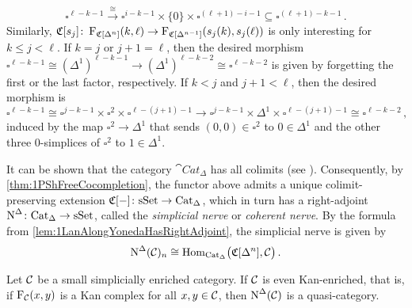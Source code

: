 \begin{con}
	\begin{equation*}
		\square^{\ell-k-1}\overset{\cong}{\longrightarrow}\square^{i-k-1}\times\{0\}\times\square^{(\ell+1)-i-1}\subseteq \square^{(\ell+1)-k-1}\,.
	\end{equation*}
	Similarly, $\mathfrak{C}[s_j]\colon \operatorname{F}_{\mathfrak{C}[\Delta^n]}(k,\ell)\rightarrow\operatorname{F}_{\mathfrak{C}[\Delta^{n-1}]}(s_j(k),s_j(\ell))$ is only interesting for $k\leqslant j<\ell$. If $k=j$ or $j+1=\ell$, then the desired morphism $\square^{\ell-k-1}\cong (\Delta^1)^{\ell-k-1}\rightarrow (\Delta^1)^{\ell-k-2}\cong \square^{\ell-k-2}$ is given by forgetting the first or the last factor, respectively. If $k<j$ and $j+1<\ell$, then the desired morphism is
	\begin{equation*}
		\square^{\ell-k-1}\cong \square^{j-k-1}\times\square^2\times\square^{\ell-(j+1)-1}\longrightarrow\square^{j-k-1}\times\Delta^1\times\square^{\ell-(j+1)-1}\cong \square^{\ell-k-2}\,,
	\end{equation*}
	induced by the map $\square^2\rightarrow\Delta^1$ that sends $(0,0)\in\square^2$ to $0\in\Delta^1$ and the other three $0$-simplices of $\square^2$ to $1\in\Delta^1$.
	
	It can be shown that the category $\cat{Cat}_\Delta$ has all colimits (see \cite[Corollary~1.2.45]{Land}). Consequently, by \cref{thm:1PShFreeCocompletion}, the functor above admits a unique colimit-preserving extension $\mathfrak{C}[-]\colon\mathrm{sSet}\rightarrow \mathrm{Cat}_\Delta$, which in turn has a right-adjoint $\operatorname{N}^\Delta\colon \mathrm{Cat}_\Delta\rightarrow\mathrm{sSet}$, called the \emph{simplicial nerve} or \emph{coherent nerve}. By the formula from \cref{lem:1LanAlongYonedaHasRightAdjoint}, the simplicial nerve is given by
	\begin{equation*}
		\operatorname{N}^\Delta(\mathcal{C})_n\cong \operatorname{Hom}_{\mathrm{Cat}_\Delta}\bigl(\mathfrak{C}[\Delta^n],\mathcal{C}\bigr)\,.
	\end{equation*}
\end{con}
\begin{lem}\label{lem:SimplicialNerveYieldsQuasiCategories}
	Let $\mathcal{C}$ be a small simplicially enriched category. If $\mathcal{C}$ is even Kan-enriched, that is, if $\operatorname{F}_{\mathcal{C}}(x,y)$ is a Kan complex for all $x,y\in\mathcal{C}$, then $\operatorname{N}^\Delta(\mathcal{C})$ is a quasi-category.
\end{lem}
